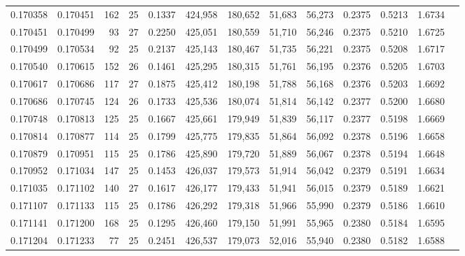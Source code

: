 \begin{tabular}{rrrrrrrrrrrrr}
0.170358 & 0.170451 & 162 &  25 &                                     0.1337 & 424,958 & 180,652 &  51,683 &  56,273 & 0.2375 & 0.5213 & 1.6734 \\
0.170451 & 0.170499 &  93 &  27 &                                     0.2250 & 425,051 & 180,559 &  51,710 &  56,246 & 0.2375 & 0.5210 & 1.6725 \\
0.170499 & 0.170534 &  92 &  25 &                                     0.2137 & 425,143 & 180,467 &  51,735 &  56,221 & 0.2375 & 0.5208 & 1.6717 \\
0.170540 & 0.170615 & 152 &  26 &                                     0.1461 & 425,295 & 180,315 &  51,761 &  56,195 & 0.2376 & 0.5205 & 1.6703 \\
0.170617 & 0.170686 & 117 &  27 &                                     0.1875 & 425,412 & 180,198 &  51,788 &  56,168 & 0.2376 & 0.5203 & 1.6692 \\
0.170686 & 0.170745 & 124 &  26 &                                     0.1733 & 425,536 & 180,074 &  51,814 &  56,142 & 0.2377 & 0.5200 & 1.6680 \\
0.170748 & 0.170813 & 125 &  25 &                                     0.1667 & 425,661 & 179,949 &  51,839 &  56,117 & 0.2377 & 0.5198 & 1.6669 \\
0.170814 & 0.170877 & 114 &  25 &                                     0.1799 & 425,775 & 179,835 &  51,864 &  56,092 & 0.2378 & 0.5196 & 1.6658 \\
0.170879 & 0.170951 & 115 &  25 &                                     0.1786 & 425,890 & 179,720 &  51,889 &  56,067 & 0.2378 & 0.5194 & 1.6648 \\
0.170952 & 0.171034 & 147 &  25 &                                     0.1453 & 426,037 & 179,573 &  51,914 &  56,042 & 0.2379 & 0.5191 & 1.6634 \\
0.171035 & 0.171102 & 140 &  27 &                                     0.1617 & 426,177 & 179,433 &  51,941 &  56,015 & 0.2379 & 0.5189 & 1.6621 \\
0.171107 & 0.171133 & 115 &  25 &                                     0.1786 & 426,292 & 179,318 &  51,966 &  55,990 & 0.2379 & 0.5186 & 1.6610 \\
0.171141 & 0.171200 & 168 &  25 &                                     0.1295 & 426,460 & 179,150 &  51,991 &  55,965 & 0.2380 & 0.5184 & 1.6595 \\
0.171204 & 0.171233 &  77 &  25 &                                     0.2451 & 426,537 & 179,073 &  52,016 &  55,940 & 0.2380 & 0.5182 & 1.6588 \\

\end{tabular}
